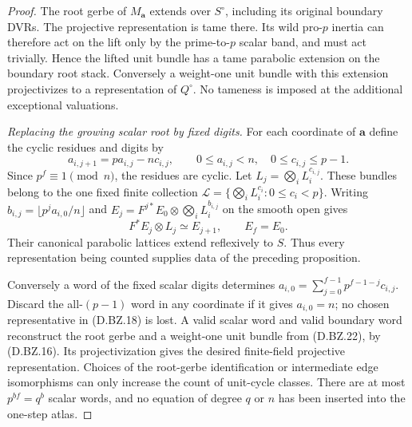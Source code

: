 \begin{proof}
The root gerbe of $M_{\mathbf a}$ extends
over $S^\circ$, including its original
boundary DVRs.  The projective representation
is tame there.  Its wild pro-$p$ inertia
can therefore act on the lift only by
the prime-to-$p$ scalar band, and must act
trivially.  Hence the lifted unit bundle
has a tame parabolic extension on the
boundary root stack.  Conversely a
weight-one unit bundle with this extension
projectivizes to a representation of
$Q^\circ$.  No tameness is imposed at
the additional exceptional valuations.

\emph{Replacing the growing scalar root by fixed digits.}
For each coordinate of $\mathbf a$ define
the cyclic residues and digits by
\[
 a_{i,j+1}=p a_{i,j}-n c_{i,j},\qquad
 0\le a_{i,j}<n,\quad 0\le c_{i,j}\le p-1.
                                                        \tag{D.BZ.21}
\]
Since $p^f\equiv1\pmod n$, the residues
are cyclic.  Let
$L_j=\bigotimes_i L_i^{c_{i,j}}$.
These bundles belong to the one fixed
finite collection
$\mathscr L=\{\bigotimes_iL_i^{c_i}:0\le c_i<p\}$.
Writing
$b_{i,j}=\lfloor p^j a_{i,0}/n\rfloor$
and
$E_j=F^{j*}E_0\otimes\bigotimes_iL_i^{b_{i,j}}$
on the smooth open gives
\[
              F^*E_j\otimes L_j\simeq E_{j+1},
                         \qquad E_f=E_0.               \tag{D.BZ.22}
\]
Their canonical parabolic lattices extend
reflexively to $S$.  Thus every representation
being counted supplies data of the preceding
proposition.

Conversely a word of the fixed scalar digits
determines
$a_{i,0}=\sum_{j=0}^{f-1}p^{f-1-j}c_{i,j}$.
Discard the all-$(p-1)$ word in any coordinate
if it gives $a_{i,0}=n$; no chosen representative
in (D.BZ.18) is lost.  A valid scalar word
and valid boundary word reconstruct the
root gerbe and a weight-one unit bundle
from (D.BZ.22), by (D.BZ.16).
Its projectivization gives the desired
finite-field projective representation.
Choices of the root-gerbe identification
or intermediate edge isomorphisms can only
increase the count of unit-cycle classes.
There are at most $p^{bf}=q^b$ scalar words,
and no equation of degree $q$ or $n$ has
been inserted into the one-step atlas.


\end{proof}
